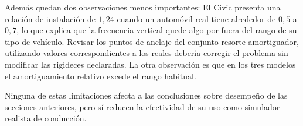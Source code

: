 

Además quedan dos observaciones menos importantes: El Civic presenta una relación de instalación de $1{,}24$ cuando un automóvil real tiene alrededor de $0{,}5$ a $0{,}7$, lo que explica que la frecuencia vertical quede algo por fuera del rango de su tipo de vehículo. Revisar los puntos de anclaje del conjunto resorte-amortiguador, utilizando valores correspondientes a los reales debería corregir el problema sin modificar las rigideces declaradas. La otra observación es que en los tres modelos el amortiguamiento relativo excede el rango habitual.

Ninguna de estas limitaciones afecta a las conclusiones sobre desempeño de las secciones anteriores, pero sí reducen la efectividad de su uso como simulador realista de conducción.




